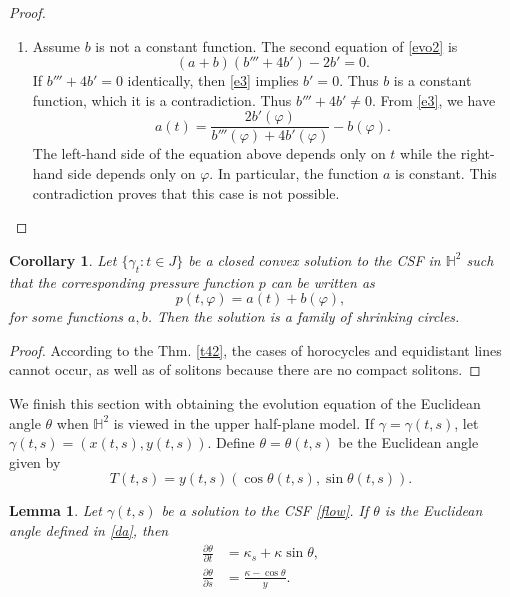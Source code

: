 \documentclass[12pt]{amsart}
\theoremstyle{plain}
\newtheorem{lemma}[theorem]{Lemma}
\newtheorem{corollary}[theorem]{Corollary}
\theoremstyle{definition}
\def\h{\mathbb H}
\def\r{\mathbb R}
\begin{document}
\begin{proof}
\begin{enumerate}
\begin{enumerate}
\item Case $a(t) =  \frac{1}{1+Ce^{2t}}$, where $t\in \r$ and $C>0$. Again, if $c=\frac12\log(C)$, let   
$$r(t)=\sinh^{-1}(e^{t+c}).$$
 Then
$$\kappa(t, \varphi) = \sqrt{p(t, \varphi)} = \sqrt{a(t)} = \frac{1}{\cosh(r(t))}.$$ 
In consequence, the solution is a family of equidistant lines. Notice that $k<1$.
 \end{enumerate}
 
 
\item Assume $b$ is not a constant function.   The second equation of \eqref{evo2} is  
\begin{equation}\label{e3}
(a+b)(b''' + 4b') - 2b' = 0.
\end{equation}
If $b'''+4b'=0$ identically, then \eqref{e3} implies $b'=0$. Thus $b$ is a constant function, which it is a contradiction. Thus  $b'''+4b'\not=0$.  From \eqref{e3}, we have 
 $$a(t) = \frac{2b'(\varphi)}{b''' (\varphi)+ 4b'(\varphi)} - b(\varphi).$$ 
The left-hand side of the equation above depends only on $t$ while the right-hand side depends only on $\varphi$. In particular, the function $a$ is constant. This contradiction proves that this case is not possible.  
\end{enumerate}
\end{proof}

\begin{corollary}
Let $\{\gamma_t\colon t \in J\}$ be a   closed  convex solution to the CSF in $\h^2$ such that the corresponding pressure function $p$ can be written as 
$$p(t, \varphi) = a(t) + b(\varphi),$$
for some functions $a,b$. Then the solution   is a  family of shrinking circles.
\end{corollary}

\begin{proof} According to the Thm. \ref{t42}, the cases of horocycles and equidistant lines cannot occur, as well as of solitons because there are no compact solitons. 
\end{proof}

We finish this section with obtaining the evolution equation of the  Euclidean angle $\theta$ when $\h^2$ is viewed in the upper half-plane model. If $\gamma=\gamma(t,s)$, let   $\gamma(t,s)=(x(t,s),y(t,s))$. Define  $\theta=\theta(t,s)$ be the Euclidean angle given by  
\begin{equation}\label{da}
T(t,s)=y(t,s)(\cos\theta(t,s),\sin\theta(t,s)).
\end{equation}


\begin{lemma} Let $\gamma(t,s)$ be  a       solution to the CSF \eqref{flow}. If $\theta$ is the Euclidean angle defined in \eqref{da}, then 
\begin{equation}\label{ea}
\begin{split}
\frac{\partial \theta}{\partial t}& = \kappa_s + \kappa \sin \theta,\\
\frac{\partial \theta}{\partial s} &= \frac{\kappa-\cos\theta}{y}.
\end{split}
\end{equation}
\end{lemma}
\end{document}
